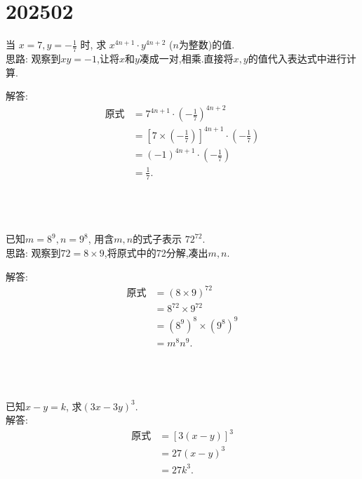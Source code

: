 \section{202502}

\item {
    当 $ x=7, y=-\frac{1}{7}$ 时, 求 $x^{4n+1}\cdot y^{4n+2}$ ($n$为整数)的值.
    \ifshowSolution
        \fangsong{}
        \\
        思路: 观察到$xy=-1$,让将$x$和$y$凑成一对,相乘.直接将$x, y$的值代入表达式中进行计算.

        解答: 
        \begin{align*}
            \mbox{原式} &= 7^{4n+1}\cdot \left(-\frac{1}{7}\right) ^{4n+2}\\
            &= [7\times(-\frac{1}{7})]^{4n+1} \cdot(-\frac{1}{7})\\
            &= (-1)^{4n+1} \cdot(-\frac{1}{7})\\
            &= \frac{1}{7}.
        \end{align*}
    \else
        \\ \\ \\
    \fi
} 

\item {
    已知$ m=8^9, n=9^8 $, 用含$m, n$的式子表示 $72^{72}$.
    \ifshowSolution
        \fangsong{}
        \\
        思路: 观察到$72=8\times 9$,将原式中的72分解,凑出$m, n$.
        
        解答: 
        \begin{align*}
            \mbox{原式} &= (8\times 9)^{72}\\
            &= 8^{72}\times 9^{72}\\
            &= (8^9)^8\times (9^8)^9\\
            &= m^8 n^9.
        \end{align*}
    \else
        \\ \\ \\
    \fi
} 

\item {
    已知$x-y=k$, 求$(3x-3y)^3.$
    \ifshowSolution
        \fangsong{}
        \\
        解答: 
        \begin{align*}
            \mbox{原式} &= [3(x-y)]^3\\
            &= 27(x-y)^3\\
            &= 27k^3.
        \end{align*}
    \else
        \\ \\ \\
    \fi
} 

